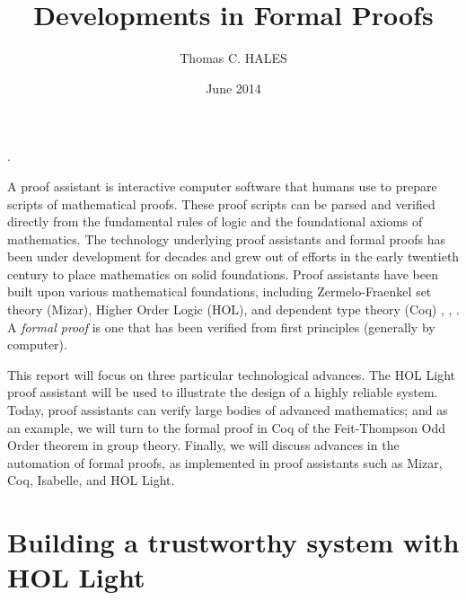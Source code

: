 \documentclass[brochure,english,12pt]{bourbaki}
\date{June 2014}
\title{Developments in Formal Proofs}
\author{Thomas C. HALES}
\theoremstyle{plain}
\begin{document}
\maketitle



{

. %




}

\bigskip



A proof assistant is interactive computer software that humans use to
prepare scripts of mathematical proofs.  These proof scripts can be
parsed and verified directly from the fundamental rules of logic and
the foundational axioms of mathematics.  The technology underlying
proof assistants and formal proofs has been under development for
decades and grew out of efforts in the early twentieth century to
place mathematics on solid foundations.  Proof assistants have been
built upon various mathematical foundations, including
Zermelo-Fraenkel set theory (Mizar), Higher Order Logic (HOL), and
dependent type theory (Coq) \cite{Mizar}, \cite{HOLL}, \cite{Coq}.  A
{\it formal proof} is one that has been verified from first principles
(generally by computer).


This report will focus on three particular technological advances.
The HOL Light proof assistant will be used to illustrate the design of
a highly reliable system.  Today, proof assistants can verify large
bodies of advanced mathematics; and  as an example, we will turn to the
formal proof in Coq of the Feit-Thompson Odd Order theorem in group
theory.  Finally, we will discuss advances in the automation of
formal proofs, as implemented in proof assistants such as Mizar, Coq,
Isabelle, and HOL Light.

\section{Building a trustworthy system with HOL Light}
\end{document}
